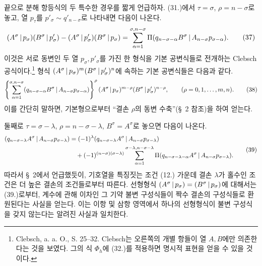 끝으로 분해 항등식의 두 특수한 경우를 짧게 언급하자. (31.)에서 $\tau=\sigma$, $\rho=n-\sigma$로 놓고, 열 $p_\tau$를 $p'_\sigma\sim q'_{n-\sigma}$로 나타내면 다음이 나온다.
\begin{equation}
\begin{aligned}
(A^\sigma\,|\,p_\sigma)(B^\sigma\,|\,p'_\sigma)
-(A^\sigma\,|\,p'_\sigma)(B^\sigma\,|\,p_\sigma)
=\sum_{\alpha=1}^{\sigma,n-\sigma}
\Pi(q_{n-\sigma-\alpha}B^\sigma\,|\,A_{n-\sigma}p_{\sigma-\alpha}).
\end{aligned}
\tag{37}
\end{equation}
이것은 서로 동변인 두 열 $p_\sigma,p'_\sigma$를 가진 한 형식을 기본 공변식들로 전개하는 Clebsch 공식이다.\footnote{Clebsch, a. a. O., S. 25--32. Clebsch는 오른쪽의 개별 항들이 열 $A,B$에만 의존한다는 것을 보였다. 그의 식 $\Phi_h$에 (32.)를 적용하면 명시적 표현을 얻을 수 있을 것이다.} 형식 $(A^\sigma\,|\,p_\sigma)^m(B^\sigma\,|\,p'_\sigma)^n$에 속하는 기본 공변식들은 다음과 같다.
\begin{equation}
 \left\{\sum_{\alpha=1}^{\sigma,n-\sigma}
 (q_{n-\sigma-\alpha}B^\sigma\,|\,A_{n-\sigma}p_{\sigma-\alpha})
 \right\}^{\rho}
 (A^\sigma\,|\,p_\sigma)^{m-\rho}(B^\sigma\,|\,p'_\sigma)^{n-\rho},
 \qquad (\rho=0,1,\ldots,m,n).
\tag{38}
\end{equation}
이를 간단히 말하면, 기본형으로부터 ``결손 $\rho$의 동변 수축''(\S\ 2 참조)을 하여 얻는다.

둘째로 $\tau=\sigma-\lambda$, $\rho=n-\sigma-\lambda$, $B^\sigma=A^\sigma$로 놓으면 다음이 나온다.
\begin{equation}
\begin{aligned}
(q_{n-\sigma-\lambda}A^\sigma\,|\,A_{n-\sigma}p_{\sigma-\lambda})
&=(-1)^\lambda(q_{n-\sigma-\lambda}A^\sigma\,|\,A_{n-\sigma}p_{\sigma-\lambda})\\
&\quad+(-1)^{(n-\sigma)(\sigma-\lambda)}
 \sum_{\alpha=1}^{\sigma-\lambda,n-\sigma-\lambda}
 \Pi(q_{n-\sigma-\lambda-\alpha}A^\sigma\,|\,A_{n-\sigma}p_{\sigma-\lambda}).
\end{aligned}
\tag{39}
\end{equation}
따라서 \S\ 2에서 언급했듯이, 기호열을 특징짓는 조건 (12.) 가운데 결손 $\lambda$가 홀수인 조건은 더 높은 결손의 조건들로부터 따른다. 선형형식 $(A^\sigma\,|\,p_\sigma)=(B^\sigma\,|\,p_\sigma)$에 대해서는 (39.)로부터, 계수에 관해 이차인 그 기약 불변 구성식들이 짝수 결손의 구성식들로 환원된다는 사실을 얻는다. 이는 이항 및 삼항 영역에서 하나의 선형형식이 불변 구성식을 갖지 않는다는 알려진 사실과 일치한다.

